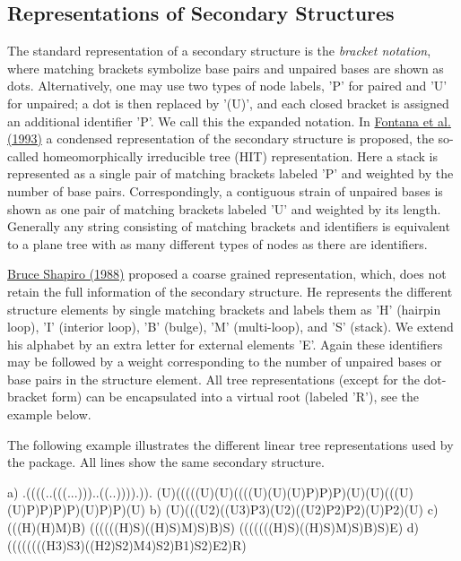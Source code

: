 \subsection*{Representations of Secondary Structures}

The standard representation of a secondary structure is the {\itshape bracket notation\/}, where matching brackets symbolize base pairs and unpaired bases are shown as dots. Alternatively, one may use two types of node labels, 'P' for paired and 'U' for unpaired; a dot is then replaced by '(U)', and each closed bracket is assigned an additional identifier 'P'. We call this the expanded notation. In \hyperlink{mp__ref_fontana_93b}{Fontana et al. (1993)} a condensed representation of the secondary structure is proposed, the so-\/called homeomorphically irreducible tree (HIT) representation. Here a stack is represented as a single pair of matching brackets labeled 'P' and weighted by the number of base pairs. Correspondingly, a contiguous strain of unpaired bases is shown as one pair of matching brackets labeled 'U' and weighted by its length. Generally any string consisting of matching brackets and identifiers is equivalent to a plane tree with as many different types of nodes as there are identifiers.

\hyperlink{mp__ref_shapiro_88}{Bruce Shapiro (1988)} proposed a coarse grained representation, which, does not retain the full information of the secondary structure. He represents the different structure elements by single matching brackets and labels them as 'H' (hairpin loop), 'I' (interior loop), 'B' (bulge), 'M' (multi-\/loop), and 'S' (stack). We extend his alphabet by an extra letter for external elements 'E'. Again these identifiers may be followed by a weight corresponding to the number of unpaired bases or base pairs in the structure element. All tree representations (except for the dot-\/bracket form) can be encapsulated into a virtual root (labeled 'R'), see the example below.

The following example illustrates the different linear tree representations used by the package. All lines show the same secondary structure.

\begin{DoxyVerb}
a) .((((..(((...)))..((..)))).)).
   (U)(((((U)(U)((((U)(U)(U)P)P)P)(U)(U)(((U)(U)P)P)P)P)(U)P)P)(U)
b) (U)(((U2)((U3)P3)(U2)((U2)P2)P2)(U)P2)(U)
c) (((H)(H)M)B)
   ((((((H)S)((H)S)M)S)B)S)
   (((((((H)S)((H)S)M)S)B)S)E)
d) ((((((((H3)S3)((H2)S2)M4)S2)B1)S2)E2)R)
\end{DoxyVerb}


